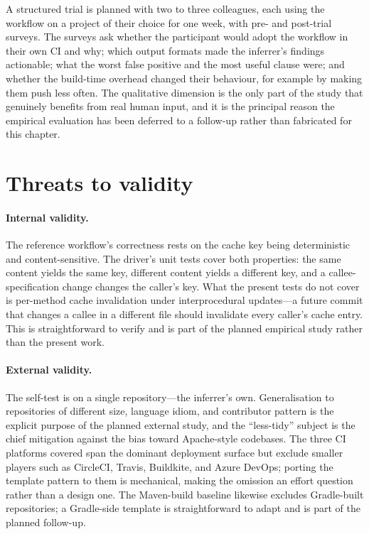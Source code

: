 A structured trial is planned with two to three colleagues, each using the
workflow on a project of their choice for one week, with pre- and post-trial
surveys. The surveys ask whether the participant would adopt the workflow in
their own CI and why; which output formats made the inferrer's findings
actionable; what the worst false positive and the most useful clause were; and
whether the build-time overhead changed their behaviour, for example by making
them push less often. The qualitative dimension is the only part of the study that
genuinely benefits from real human input, and it is the principal reason the
empirical evaluation has been deferred to a follow-up rather than fabricated for
this chapter.

\section{Threats to validity}
\label{sec:ci-threats}

\paragraph{Internal validity.} The reference workflow's correctness rests on the
cache key being deterministic and content-sensitive. The driver's unit tests
cover both properties: the same content yields the same key, different content
yields a different key, and a callee-specification change changes the caller's
key. What the present tests do not cover is per-method cache invalidation under
interprocedural updates---a future commit that changes a callee in a different
file should invalidate every caller's cache entry. This is straightforward to
verify and is part of the planned empirical study rather than the present work.

\paragraph{External validity.} The self-test is on a single repository---the
inferrer's own. Generalisation to repositories of different size, language idiom,
and contributor pattern is the explicit purpose of the planned external study,
and the ``less-tidy'' subject is the chief mitigation against the bias toward
Apache-style codebases. The three CI platforms covered span the dominant
deployment surface but exclude smaller players such as CircleCI, Travis,
Buildkite, and Azure DevOps; porting the template pattern to them is mechanical,
making the omission an effort question rather than a design one. The Maven-build
baseline likewise excludes Gradle-built repositories; a Gradle-side template is
straightforward to adapt and is part of the planned follow-up.

